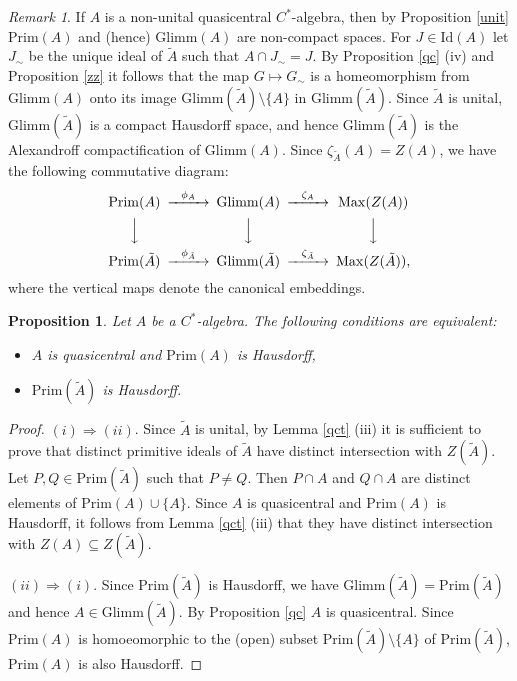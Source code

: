 \documentclass[]{amsart}
\newtheorem{proposition}[theorem]{Proposition}
\theoremstyle{remark}
\newtheorem{remark}[theorem]{Remark}
\theoremstyle{definition}
\theoremstyle{question}
\numberwithin{equation}{section}
\begin{document}
\begin{remark}
If $A$ is a non-unital quasicentral $C^*$-algebra, then by Proposition \ref{unit}
$\mathrm{Prim}(A)$ and (hence) $\mathrm{Glimm}(A)$
are non-compact spaces. For $J \in \mathrm{Id}(A)$ let $J_\sim$ be the unique ideal of $\tilde{A}$ such that $A \cap J_\sim=J$.
By Proposition \ref{qc} (iv) and Proposition \ref{zz} it follows that the map $G \mapsto G_\sim$ is a homeomorphism from
$\mathrm{Glimm}(A)$ onto its image
$\mathrm{Glimm}(\tilde{A})\setminus \{A\}$ in $\mathrm{Glimm}(\tilde{A})$. Since
$\tilde{A}$ is unital, $\mathrm{Glimm}(\tilde{A})$ is a compact Hausdorff space,
and hence $\mathrm{Glimm}(\tilde{A})$ is the Alexandroff compactification of
$\mathrm{Glimm}(A)$. Since $\zeta_{\tilde{A}}(A)=Z(A)$, we have the following commutative diagram:
$$\begin{CD}
\mathrm{Prim}(A) @> \phi_A >> \mathrm{Glimm}(A) @> \zeta_A >>
\mathrm{Max}(Z(A))\\
@V  VV@V  VV @V  VV\\
\mathrm{Prim}(\tilde{A}) @>\phi_{\tilde{A}}>> \mathrm{Glimm}(\tilde{A})
@>\zeta_{\tilde{A}}>> \mathrm{Max}(Z(\tilde{A})),
\end{CD}$$
where the vertical maps denote the canonical embeddings.
\end{remark}

\begin{proposition}\label{A+} Let $A$ be a $C^*$-algebra. The following
conditions are equivalent:
\begin{itemize}\item[(i)] $A$ is quasicentral and $\mathrm{Prim}(A)$ is
Hausdorff,
\item[(ii)] $\mathrm{Prim}(\tilde{A})$ is Hausdorff.
\end{itemize}
\end{proposition}
\begin{proof} $(i)\Rightarrow (ii)$. Since $\tilde{A}$ is unital, by Lemma \ref{qct} (iii)
it is sufficient to prove that distinct primitive ideals of
$\tilde{A}$ have distinct intersection with $Z(\tilde{A})$. Let $P,Q \in
\mathrm{Prim}(\tilde{A})$ such that $P \neq Q$. Then $P\cap A$ and $Q \cap A$
are distinct elements of $\mathrm{Prim}(A) \cup \{A\}$. Since $A$ is quasicentral and $\mathrm{Prim}(A)$
is Hausdorff, it follows from Lemma \ref{qct} (iii) that they have
distinct intersection with $Z(A) \subseteq Z(\tilde{A})$.

$(ii)\Rightarrow (i)$. Since $\mathrm{Prim}(\tilde{A})$ is Hausdorff, we have $\mathrm{Glimm}(\tilde{A})=\mathrm{Prim}(\tilde{A})$ and
hence $A \in \mathrm{Glimm}(\tilde{A})$. By Proposition \ref{qc} $A$ is
quasicentral. Since $\mathrm{Prim}(A)$ is homoeomorphic to the (open) subset $\mathrm{Prim}(\tilde{A})\setminus\{A\}$ of $\mathrm{Prim}(\tilde{A})$,  $\mathrm{Prim}(A)$ is also Hausdorff.
\end{proof}
\end{document}
